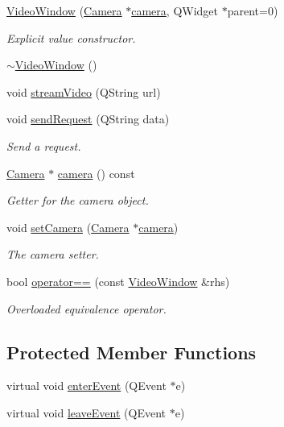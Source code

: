 \begin{DoxyCompactItemize}
\item 
\hyperlink{classVideoWindow_a6867be437aebded8b690a9b95216df07}{Video\-Window} (\hyperlink{classCamera}{Camera} $\ast$\hyperlink{classVideoWindow_aa163a5850ff726c12f59562b993e4403}{camera}, Q\-Widget $\ast$parent=0)
\begin{DoxyCompactList}\small\item\em Explicit value constructor. \end{DoxyCompactList}\item 
\hyperlink{classVideoWindow_a3c5b83ed86071f9210388f0e06ac4876}{$\sim$\-Video\-Window} ()
\item 
void \hyperlink{classVideoWindow_ac71a3e790d6956a26369294d5fb36c93}{stream\-Video} (Q\-String url)
\item 
void \hyperlink{classVideoWindow_af5830c7faa6e46a69be02c93abc28d3a}{send\-Request} (Q\-String data)
\begin{DoxyCompactList}\small\item\em Send a request. \end{DoxyCompactList}\item 
\hyperlink{classCamera}{Camera} $\ast$ \hyperlink{classVideoWindow_aa163a5850ff726c12f59562b993e4403}{camera} () const 
\begin{DoxyCompactList}\small\item\em Getter for the camera object. \end{DoxyCompactList}\item 
void \hyperlink{classVideoWindow_a612b1b179b04ccebce717ff2fd95879e}{set\-Camera} (\hyperlink{classCamera}{Camera} $\ast$\hyperlink{classVideoWindow_aa163a5850ff726c12f59562b993e4403}{camera})
\begin{DoxyCompactList}\small\item\em The camera setter. \end{DoxyCompactList}\item 
bool \hyperlink{classVideoWindow_af11854a41b4e79c396c04bc40789b46d}{operator==} (const \hyperlink{classVideoWindow}{Video\-Window} \&rhs)
\begin{DoxyCompactList}\small\item\em Overloaded equivalence operator. \end{DoxyCompactList}\end{DoxyCompactItemize}
\subsection*{Protected Member Functions}
\begin{DoxyCompactItemize}
\item 
virtual void \hyperlink{classVideoWindow_aba663642b1a2911fc83c366c50fc1378}{enter\-Event} (Q\-Event $\ast$e)
\item 
virtual void \hyperlink{classVideoWindow_a58ad769fa96f197fd1212a9cbf5984d1}{leave\-Event} (Q\-Event $\ast$e)
\end{DoxyCompactItemize}


